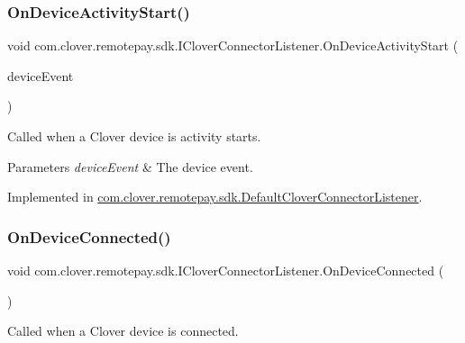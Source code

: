 \subsubsection{\texorpdfstring{On\+Device\+Activity\+Start()}{OnDeviceActivityStart()}}
{\footnotesize\ttfamily void com.\+clover.\+remotepay.\+sdk.\+I\+Clover\+Connector\+Listener.\+On\+Device\+Activity\+Start (\begin{DoxyParamCaption}\item[{\hyperlink{classcom_1_1clover_1_1remotepay_1_1sdk_1_1_clover_device_event}{Clover\+Device\+Event}}]{device\+Event }\end{DoxyParamCaption})}



Called when a Clover device is activity starts. 


\begin{DoxyParams}{Parameters}
{\em device\+Event} & The device event.\\
\hline
\end{DoxyParams}


Implemented in \hyperlink{classcom_1_1clover_1_1remotepay_1_1sdk_1_1_default_clover_connector_listener_aec99f93d834adb5f8fb2ff1837391b5e}{com.\+clover.\+remotepay.\+sdk.\+Default\+Clover\+Connector\+Listener}.

\mbox{\label{interfacecom_1_1clover_1_1remotepay_1_1sdk_1_1_i_clover_connector_listener_aa859c19d05f11d75365161fb96c54eda}} 
\subsubsection{\texorpdfstring{On\+Device\+Connected()}{OnDeviceConnected()}}
{\footnotesize\ttfamily void com.\+clover.\+remotepay.\+sdk.\+I\+Clover\+Connector\+Listener.\+On\+Device\+Connected (\begin{DoxyParamCaption}{ }\end{DoxyParamCaption})}



Called when a Clover device is connected. 



